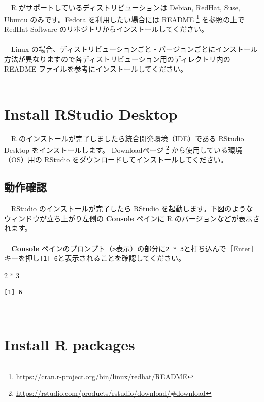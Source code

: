 \documentclass[
  12pt,
]{book}
\newenvironment{Shaded}{\begin{snugshade}}{\end{snugshade}}
\newcommand{\DecValTok}[1]{\textcolor[rgb]{0.00,0.00,0.81}{#1}}
\newcommand{\SpecialCharTok}[1]{\textcolor[rgb]{0.00,0.00,0.00}{#1}}
\DeclareRobustCommand{\href}[2]{#2\footnote{\url{#1}}}
\begin{document}
　R がサポートしているディストリビューションは Debian, RedHat, Suse, Ubuntu のみです。Fedora を利用したい場合には \href{https://cran.r-project.org/bin/linux/redhat/README}{README } を参照の上で RedHat Software のリポジトリからインストールしてください。\\
　\\
　Linux の場合、ディストリビューションごと・バージョンごとにインストール方法が異なりますので各ディストリビューション用のディレクトリ内の README ファイルを参考にインストールしてください。\\
　

\hypertarget{install-rstudio-desktop}{%
\section{Install RStudio Desktop}\label{install-rstudio-desktop}}

　R のインストールが完了しましたら統合開発環境（IDE）である RStudio Desktop をインストールします。 \href{https://rstudio.com/products/rstudio/download/\#download}{Downloadページ } から使用している環境（OS）用の RStudio をダウンロードしてインストールしてください。 　

\hypertarget{ux52d5ux4f5cux78baux8a8d}{%
\subsection{動作確認}\label{ux52d5ux4f5cux78baux8a8d}}

　RStudio のインストールが完了したら RStudio を起動します。下図のようなウィンドウが立ち上がり左側の \textbf{Console} ペインに R のバージョンなどが表示されます。\\
　\\

　\textbf{Console} ペインのプロンプト（\texttt{\textgreater{}}表示）の部分に\texttt{2\ *\ 3}と打ち込んで［Enter］キーを押し\texttt{{[}1{]}\ 6}と表示されることを確認してください。

\begin{Shaded}
\begin{Highlighting}[]
\DecValTok{2} \SpecialCharTok{*} \DecValTok{3}
\end{Highlighting}
\end{Shaded}

\begin{verbatim}
[1] 6
\end{verbatim}

　

\hypertarget{install-r-packages}{%
\section{Install R packages}\label{install-r-packages}}
\end{document}

